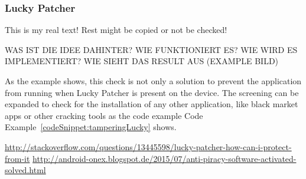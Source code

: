 \subsubsection{Lucky Patcher} \label{subsection:counter-improve-tampering-luckypatcher}
This is my real text! Rest might be copied or not be checked!



WAS IST DIE IDEE DAHINTER? WIE FUNKTIONIERT ES? WIE WIRD ES IMPLEMENTIERT? WIE SIEHT DAS RESULT AUS (EXAMPLE BILD)\newline

As the example shows, this check is not only a solution to prevent the application from running when Lucky Patcher is present on the device. The screening can be expanded to check for the installation of any other application, like black market apps or other cracking tools as the code example Code Example~\ref{codeSnippet:tamperingLucky} shows.

\url{http://stackoverflow.com/questions/13445598/lucky-patcher-how-can-i-protect-from-it}\newline
\url{http://android-onex.blogspot.de/2015/07/anti-piracy-software-activated-solved.html}\newline


